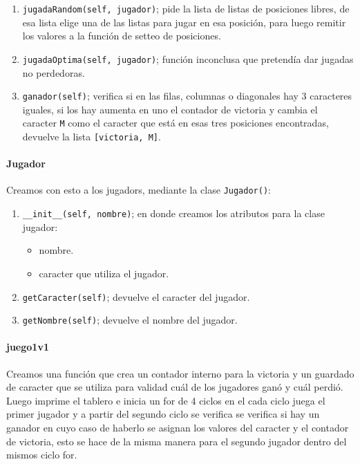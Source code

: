 \begin{enumerate}
		\item \texttt{jugadaRandom(self, jugador)}; pide la lista de listas de posiciones libres, de esa lista elige una de las listas para jugar en esa posición, para luego remitir los valores a la función de setteo de posiciones. 
		
		\item \texttt{jugadaOptima(self, jugador)}; función inconclusa que pretendía dar jugadas no perdedoras.
		
		\item \texttt{ganador(self)}; verifica si en las filas, columnas o diagonales hay 3 caracteres iguales, si los hay aumenta en uno el contador de victoria  y cambia el caracter \texttt{M} como el caracter que está en esas tres posiciones encontradas, devuelve la lista \texttt{[victoria, M]}.
		
	\end{enumerate}
	
	\paragraph{Jugador} Creamos con esto a los jugadors, mediante la clase \texttt{Jugador()}:
	
	\begin{enumerate}
		\item \texttt{\_\_init\_\_(self, nombre)}; en donde creamos los atributos para la clase jugador:
		\begin{itemize}
			\item nombre.
			
			\item caracter que utiliza el jugador.
		\end{itemize}
		
		\item \texttt{getCaracter(self)}; devuelve el caracter del jugador.
		
		\item \texttt{getNombre(self)}; devuelve el nombre del jugador.
	\end{enumerate}
	
	\paragraph{juego1v1}
	
	Creamos una función que crea un contador interno para la victoria y un guardado de caracter que se utiliza para validad cuál de los jugadores ganó y cuál perdió. Luego imprime el tablero e inicia un for de 4 ciclos en el cada ciclo juega el primer jugador y a partir del segundo ciclo se verifica se verifica si hay un ganador en cuyo caso de haberlo se asignan los valores del caracter y el contador de victoria, esto se hace de la misma manera para el segundo jugador dentro del mismos ciclo for.
	
